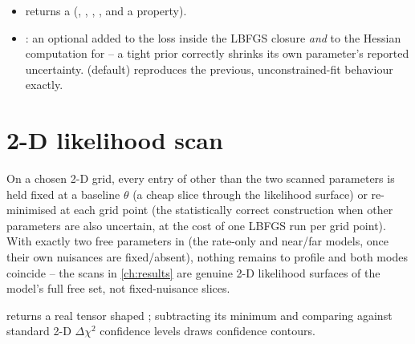 \begin{implbox}
\begin{itemize}
  \item {}
    returns a  (, ,
    , , and a  property).
  \item {}: an optional 
    added to the loss inside the LBFGS closure \emph{and} to the Hessian
    computation for  -- a tight prior
    correctly shrinks its own parameter's reported uncertainty. 
    (default) reproduces the previous, unconstrained-fit behaviour exactly.
\end{itemize}
\end{implbox}

\section{2-D likelihood scan}
\label{sec:likelihood-scan}


\begin{theorybox}
On a chosen 2-D grid, every entry of  other than the two
scanned parameters is held fixed at a baseline $\theta$ (a cheap slice
through the likelihood surface) or re-minimised at each grid point (the
statistically correct construction when other parameters are also
uncertain, at the cost of one LBFGS run per grid point). With exactly two
free parameters in  (the rate-only and near/far models,
once their own nuisances are fixed/absent), nothing remains to profile and
both modes coincide -- the scans in \cref{ch:results} are genuine 2-D
likelihood surfaces of the model's full free set, not fixed-nuisance
slices.
\end{theorybox}

\begin{implbox}
 returns a real tensor shaped ;
subtracting its minimum and comparing against standard 2-D $\Delta\chi^2$
confidence levels draws confidence contours.
\end{implbox}
